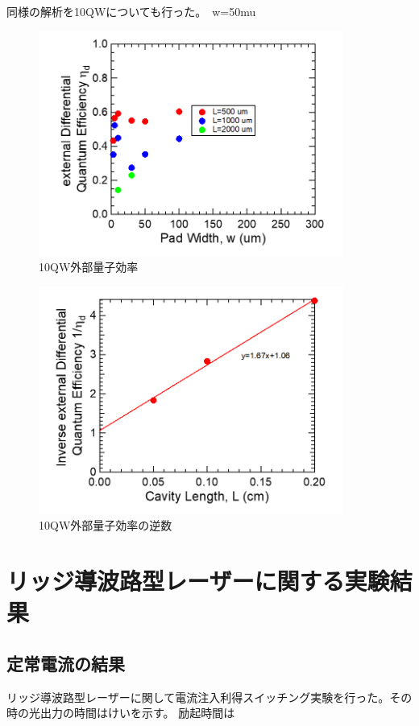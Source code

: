 同様の解析を10QWについても行った。　w=50mu
\begin{figure}[h]
	\centering
	\includegraphics[width=10cm]{figure/fig_3_1_10QW_broadcontact_id.png}
	\caption{10QW外部量子効率}
	\label{fig:fig_3_1_10QW_broadcontact_id}
\end{figure}

\begin{figure}[h]
	\centering
	\includegraphics[width=10cm]{figure/fig_3_1_10QW_broadcontact_id_inverse.png}
	\caption{10QW外部量子効率の逆数}
	\label{fig:fig_3_1_10QW_broadcontact_id_inverse}
\end{figure}


\newpage
\newpage
\newpage
\clearpage
\section{リッジ導波路型レーザーに関する実験結果}%
\subsection{定常電流の結果}
リッジ導波路型レーザーに関して電流注入利得スイッチング実験を行った。その時の光出力の時間はけいを示す。
励起時間は
